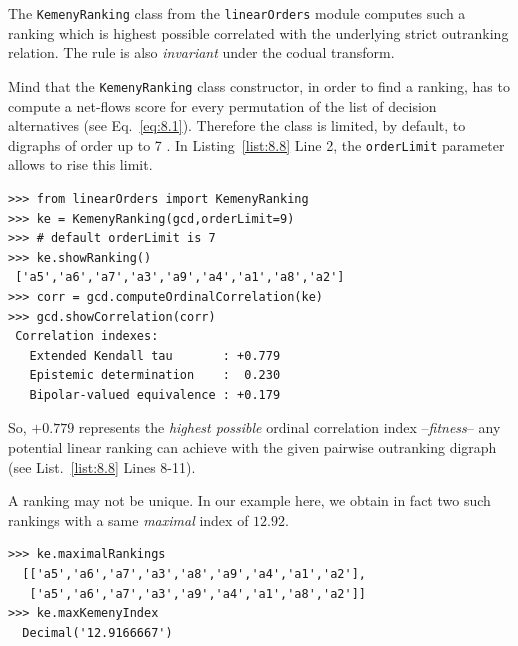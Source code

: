 The \texttt{KemenyRanking} class from the \texttt{linearOrders} module computes such a ranking which is highest possible correlated with the underlying strict outranking relation. The \Kemeny rule is also \emph{invariant} under the codual transform.

Mind that the \texttt{KemenyRanking} class constructor, in order to find a \Kemeny ranking, has to compute a net-flows score for every permutation of the list of decision alternatives (see Eq.~\vref{eq:8.1}). Therefore the class is limited, by default, to digraphs of order up to 7 \citep{BIS-2021b}. In Listing~\vref{list:8.8} Line 2, the \texttt{orderLimit} parameter allows to rise this limit.
\begin{lstlisting}[caption={Computing a \Kemeny ranking},label=list:8.8]   
>>> from linearOrders import KemenyRanking
>>> ke = KemenyRanking(gcd,orderLimit=9)
>>> # default orderLimit is 7
>>> ke.showRanking()
 ['a5','a6','a7','a3','a9','a4','a1','a8','a2']
>>> corr = gcd.computeOrdinalCorrelation(ke)
>>> gcd.showCorrelation(corr)
 Correlation indexes:
   Extended Kendall tau       : +0.779
   Epistemic determination    :  0.230
   Bipolar-valued equivalence : +0.179
\end{lstlisting}    

So, $+0.779$ represents the \emph{highest possible} ordinal correlation index --\emph{fitness}-- any potential linear ranking can achieve with the given pairwise outranking digraph (see List.~\vref{list:8.8} Lines 8-11).

A \Kemeny ranking may not be unique. In our example here, we obtain in fact two such \Kemeny rankings with a same \emph{maximal} \Kemeny index of $12.92$. 
\begin{lstlisting}[caption={Optimal \Kemeny rankings},label=list:8.9]
>>> ke.maximalRankings
  [['a5','a6','a7','a3','a8','a9','a4','a1','a2'],
   ['a5','a6','a7','a3','a9','a4','a1','a8','a2']]
>>> ke.maxKemenyIndex
  Decimal('12.9166667')
\end{lstlisting}

